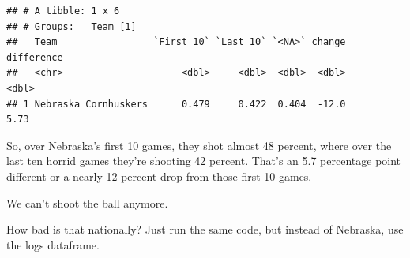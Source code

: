 \documentclass[]{book}
\newenvironment{Shaded}{\begin{snugshade}}{\end{snugshade}}
\newcommand{\KeywordTok}[1]{\textcolor[rgb]{0.13,0.29,0.53}{\textbf{#1}}}
\newcommand{\DataTypeTok}[1]{\textcolor[rgb]{0.13,0.29,0.53}{#1}}
\newcommand{\DecValTok}[1]{\textcolor[rgb]{0.00,0.00,0.81}{#1}}
\newcommand{\StringTok}[1]{\textcolor[rgb]{0.31,0.60,0.02}{#1}}
\newcommand{\OperatorTok}[1]{\textcolor[rgb]{0.81,0.36,0.00}{\textbf{#1}}}
\newcommand{\NormalTok}[1]{#1}
\begin{document}
\begin{Shaded}
\end{Shaded}

\begin{verbatim}
## # A tibble: 1 x 6
## # Groups:   Team [1]
##   Team                 `First 10` `Last 10` `<NA>` change difference
##   <chr>                     <dbl>     <dbl>  <dbl>  <dbl>      <dbl>
## 1 Nebraska Cornhuskers      0.479     0.422  0.404  -12.0       5.73
\end{verbatim}

So, over Nebraska's first 10 games, they shot almost 48 percent, where
over the last ten horrid games they're shooting 42 percent. That's an
5.7 percentage point different or a nearly 12 percent drop from those
first 10 games.

We can't shoot the ball anymore.

How bad is that nationally? Just run the same code, but instead of
Nebraska, use the logs dataframe.
\end{document}
